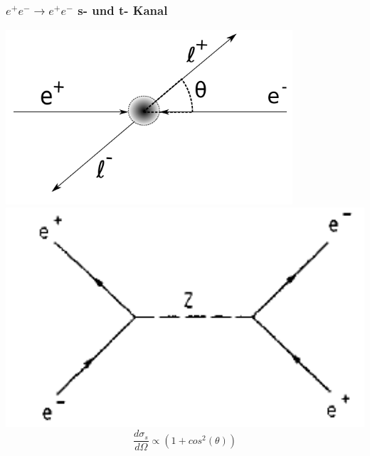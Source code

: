 \begin{frame}
	\frametitle{ $e^+e^- \rightarrow e^+e^-$ s- und t- Kanal}
	\begin{minipage}{0.49\linewidth}
		\centering
		\includegraphics[width=0.8\textwidth]{graphics/AsymmetrieWinkel}\\
		\includegraphics[width=1.0\textwidth]{graphics/annihilationee.png}
		\begin{equation*}
		\frac{d\sigma_s}{d\Omega} \propto (1+cos^2(\theta))
		\end{equation*}
	\end{minipage}
	\begin{minipage}{0.49\linewidth}
		\mbox{}\\\mbox{}\\
		\begin{figure}

\end{figure}
\end{minipage}
\end{frame}
